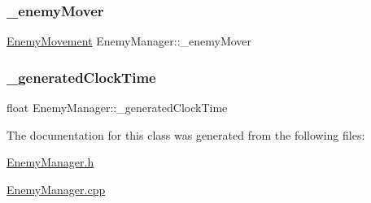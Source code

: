 \mbox{\label{class_enemy_manager_ade1b38d513c67ab3d461639c1d7c7bad}} 
\subsubsection{\texorpdfstring{\+\_\+enemy\+Mover}{\_enemyMover}}
{\footnotesize\ttfamily \hyperlink{class_enemy_movement}{Enemy\+Movement} Enemy\+Manager\+::\+\_\+enemy\+Mover\hspace{0.3cm}{\ttfamily [private]}}

\mbox{\label{class_enemy_manager_acc7728a6a32d399ca416558f7b769090}} 
\subsubsection{\texorpdfstring{\+\_\+generated\+Clock\+Time}{\_generatedClockTime}}
{\footnotesize\ttfamily float Enemy\+Manager\+::\+\_\+generated\+Clock\+Time\hspace{0.3cm}{\ttfamily [private]}}



The documentation for this class was generated from the following files\+:\begin{DoxyCompactItemize}
\item 
\hyperlink{_enemy_manager_8h}{Enemy\+Manager.\+h}\item 
\hyperlink{_enemy_manager_8cpp}{Enemy\+Manager.\+cpp}\end{DoxyCompactItemize}
